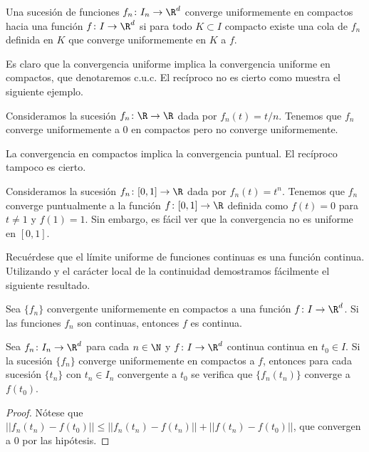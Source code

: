 \documentclass{article}
\begin{document}
\begin{definition}
  Una sucesión de funciones $f_n \colon I_{n} \to \R^d$ converge uniformemente en compactos hacia
  una función $f \colon I \to \R^d$ si para todo $K \subset I$ compacto existe una cola de $f_n$
  definida en $K$ que converge uniformemente en $K$ a $f$.
\end{definition}

Es claro que la convergencia uniforme implica la convergencia uniforme en compactos, que denotaremos
c.u.c. El recíproco no es cierto como muestra el siguiente ejemplo.

\begin{ex}
  Consideramos la sucesión $f_n \colon \R \to \R$ dada por $f_n(t) = t / n$. Tenemos que $f_n$
  converge uniformemente a $0$ en compactos pero no converge uniformemente.
\end{ex}

La convergencia en compactos implica la convergencia puntual. El recíproco tampoco es cierto.

\begin{ex}
  Consideramos la sucesión $f_n \colon [0,1] \to \R$ dada por $f_n(t) = t^n$. Tenemos que $f_n$
  converge puntualmente a la función $f \colon [0,1] \to \R$ definida como $f(t) = 0$ para $t \ne 1$
  y $f(1) = 1$. Sin embargo, es fácil ver que la convergencia no es uniforme en $[0,1]$.
\end{ex}

Recuérdese que el límite uniforme de funciones continuas es una función continua. Utilizando y el
carácter local de la continuidad demostramos fácilmente el siguiente resultado.

\begin{prop}
  Sea $\{f_n\}$ convergente uniformemente en compactos a una función $f \colon I \to \R^d$. Si las
  funciones $f_n$ son continuas, entonces $f$ es continua.
\end{prop}

\begin{lemma}
  Sea $f_n \colon I_n \to \R^d$ para cada $n \in \N$ y $f \colon I \to \R^d$ continua continua en
  $t_0 \in I$. Si la sucesión $\{f_n\}$ converge uniformemente en compactos a $f$, entonces para
  cada sucesión $\{t_n\}$ con $t_n \in I_n$ convergente a $t_0$ se verifica que $\{f_n(t_n)\}$
  converge a $f(t_0)$.
\end{lemma}
\begin{proof}
  Nótese que $||f_n(t_n) - f(t_0) || \le ||f_n(t_n) - f(t_n) || + ||f(t_n) - f(t_0) ||$, que
  convergen a $0$ por las hipótesis.
\end{proof}
\end{document}
